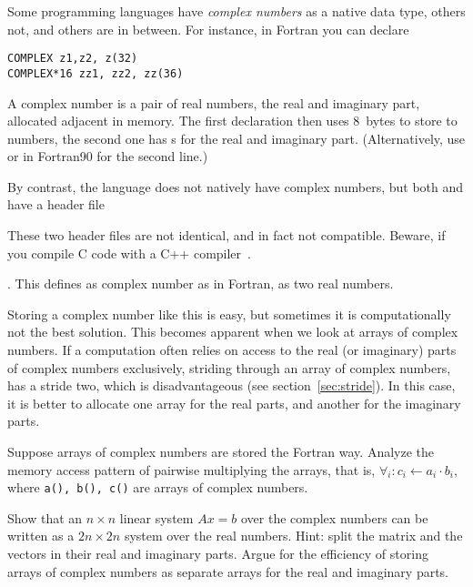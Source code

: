 Some programming languages have \emph{complex numbers} as a native data type,
others not, and others are in between. For instance, in Fortran you
can declare
\begin{verbatim}
COMPLEX z1,z2, z(32)
COMPLEX*16 zz1, zz2, zz(36)
\end{verbatim}
A complex number is a pair of real numbers, the real and imaginary
part, allocated adjacent in memory. The first declaration then uses
8~bytes to store to  numbers, the second one has s
for the real and imaginary part.  (Alternatively, use  or in Fortran90  for the second line.)

By contrast, the  language does not natively have complex
numbers, but both  and  have a  header
file
\begin{footnoteenv}
  {These two header files are not identical, and in fact
  not compatible. Beware, if you compile C code with a C++
  compiler~\cite{DobbsComplex}.}
\end{footnoteenv}
. This defines as complex number as in
Fortran, as two real numbers.

Storing a complex number like this is easy, but sometimes it is
computationally not the best solution. This becomes apparent when we
look at arrays of complex numbers.
If a computation often relies
on access to the real (or imaginary) parts of complex numbers
exclusively, striding through an array of complex numbers, has a
stride two, which is disadvantageous (see
section~\ref{sec:stride}). In this case, it is better to allocate one
array for the real parts, and another for the imaginary parts.

\begin{exercise}
  Suppose arrays of complex numbers are stored the Fortran
  way. Analyze the memory access pattern of pairwise multiplying the
  arrays, that is, $\forall_i\colon c_i\leftarrow a_i\cdot b_i$, where
  \texttt{a(), b(), c()} are arrays of complex numbers.
\end{exercise}

\begin{exercise}
  Show that an $n\times n$ linear system $Ax=b$ over the complex numbers
  can be written as a $2n\times 2n$ system over the real
  numbers. Hint: split the matrix and the vectors in their real and
  imaginary parts. Argue for the efficiency of storing arrays of
  complex numbers as separate arrays for the real and imaginary parts.
\end{exercise}

